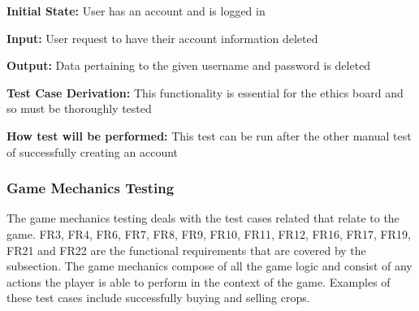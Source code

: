 \documentclass[12pt, titlepage]{article}
\begin{document}
\begin{enumerate}
\textbf{Initial State:} User has an account and is logged in
					
\textbf{Input:} User request to have their account information deleted
					
\textbf{Output:} Data pertaining to the given username and password is deleted

\textbf{Test Case Derivation:} This functionality is essential for the ethics board and so must be thoroughly tested

\textbf{How test will be performed:} This test can be run after the other manual test of successfully creating an account

\end{enumerate}

\subsubsection{Game Mechanics Testing}
The game mechanics testing deals with the test cases related that relate to the game. FR3, FR4, FR6, FR7, FR8, FR9, FR10, FR11, FR12, FR16, FR17, FR19, FR21 and FR22 are the functional requirements that are covered by the subsection. The game mechanics compose of all the game logic and consist of any actions the player is able to perform in the context of the game. Examples of these test cases include successfully buying and selling crops.
\end{document}
